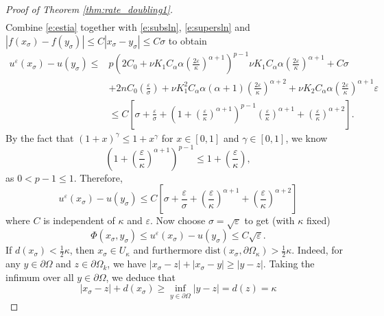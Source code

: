 \documentclass[12pt,reqno]{amsart}
\numberwithin{figure}{section}
\theoremstyle{plain}
\theoremstyle{remark}
\numberwithin{equation}{section}
\begin{document}
\begin{proof}[Proof of Theorem \ref{thm:rate_doubling1}]
\begin{align}
\end{align}
Combine \eqref{e:estia} together with \eqref{e:subsln}, \eqref{e:supersln} and $|f(x_\sigma) - f(y_\sigma)|\leq C|x_\sigma - y_\sigma|\leq C\sigma$ to obtain
\begin{align*}
     u^\varepsilon(x_\sigma) - u(y_\sigma) \leq & p\left(2C_0+\nu K_1 C_\alpha \alpha\left( \frac{2\varepsilon}{\kappa}\right)^{\alpha+1}\right)^{p-1}\nu K_1 C_\alpha \alpha \left(\frac{2\varepsilon}{\kappa}\right)^{\alpha+1} + C\sigma\nonumber\\
    &+2nC_0\left(\frac{\varepsilon}{\sigma}\right) + \nu K_1^2C_\alpha \alpha(\alpha+1)\left(\frac{2\varepsilon}{\kappa}\right)^{\alpha+2} + \nu K_2 C_\alpha \alpha  \left(\frac{2\varepsilon}{\kappa}\right)^{\alpha+1}\varepsilon\nonumber\\
    &\leq C\left[\sigma + \frac{\varepsilon}{\sigma} + \left(1+\left(\frac{\varepsilon}{\kappa}\right)^{\alpha+1}\right)^{p-1}\left(\frac{\varepsilon}{\kappa}\right)^{\alpha+1} + \left(\frac{\varepsilon}{\kappa}\right)^{\alpha+2} \right].
\end{align*}
By the fact that $(1+x)^\gamma \leq 1+x^\gamma$ for $x\in [0,1]$ and $\gamma\in [0,1]$, we know
\begin{equation*}
    \left(1+\left(\frac{\varepsilon}{\kappa}\right)^{\alpha+1}\right)^{p-1} \leq 1+ \left(\frac{\varepsilon}{\kappa}\right),
\end{equation*}
as $0<p-1\leq 1$.
Therefore,
\begin{equation*}
     u^\varepsilon(x_\sigma) - u(y_\sigma) \leq C\left[\sigma + \frac{\varepsilon}{\sigma} + \left(\frac{\varepsilon}{\kappa}\right)^{\alpha+1} + \left(\frac{\varepsilon}{\kappa}\right)^{\alpha+2}\right]
\end{equation*}
where $C$ is independent of $\kappa$ and $\varepsilon$. Now choose $\sigma = \sqrt{\varepsilon}$ to get (with $\kappa$ fixed)
\begin{equation}\label{e:final1}
    \Phi(x_\sigma,y_\sigma) \leq u^\varepsilon(x_\sigma) - u(y_\sigma) \leq C\sqrt{\varepsilon}.
\end{equation}
If $d(x_\sigma) < \frac{1}{2}\kappa$, then $x_\sigma \in U_\kappa$ and furthermore $\mathrm{dist}(x_\sigma,\partial \Omega_\kappa) > \frac{1}{2}\kappa$. Indeed, for any $y\in\partial\Omega$ and $z\in \partial\Omega_k$, we have $|x_\sigma - z| + |x_\sigma - y| \geq |y-z|$. Taking the infimum over all $y\in \partial\Omega$, we deduce that
\begin{equation*}
    |x_\sigma - z| + d(x_\sigma) \geq \inf_{y\in \partial \Omega}|y-z| = d(z) = \kappa

\end{equation*}
\end{proof}
\end{document}
